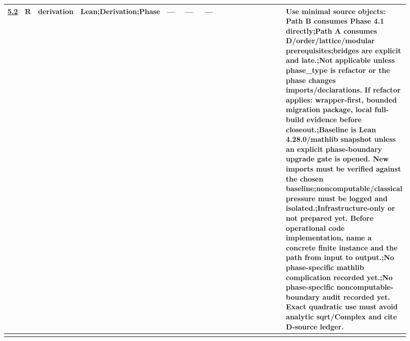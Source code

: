 \begin{longtable}{L{0.026\linewidth} L{0.024\linewidth} L{0.045\linewidth} L{0.07\linewidth} L{0.065\linewidth} L{0.075\linewidth} L{0.11\linewidth} L{0.19\linewidth} L{0.155\linewidth} L{0.17\linewidth}}
\hline
\addlinespace[0.24em]
\hyperlink{phase-row-5-2}{5.2} & R & derivation & Lean;\newline Derivation;\newline Phase & --- & --- & --- &  &  & Use minimal source objects: Path B consumes Phase 4.1 directly;\newline Path A consumes D/\allowbreak{}order/\allowbreak{}lattice/\allowbreak{}modular prerequisites;\newline bridges are explicit and late.;\newline Not applicable unless phase\_type is refactor or the phase changes imports/\allowbreak{}declarations. If refactor applies: wrapper-first, bounded migration package, local full-build evidence before closeout.;\newline Baseline is Lean 4.28.0/\allowbreak{}mathlib snapshot unless an explicit phase-boundary upgrade gate is opened. New imports must be verified against the chosen baseline;\newline noncomputable/\allowbreak{}classical pressure must be logged and isolated.;\newline Infrastructure-only or not prepared yet. Before operational code implementation, name a concrete finite instance and the path from input to output.;\newline No phase-specific mathlib complication recorded yet.;\newline No phase-specific noncomputable-boundary audit recorded yet. Exact quadratic use must avoid analytic sqrt/\allowbreak{}Complex and cite D-source ledger.\\
\hline
\addlinespace[0.24em]

\end{longtable}
